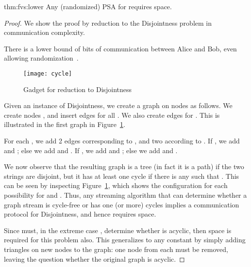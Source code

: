 \documentclass[11pt,letter]{article}
\newcommand{\COMMENTED}[1]{{}}
\newcommand{\junk}[1]{\COMMENTED{#1}}
\begin{document}
\begin{reptheorem}{thm:fvs:lower}
Any (randomized) PSA for  requires  space.
\end{reptheorem}


\begin{proof}
We show the proof by reduction to the {\textsc Disjointness} problem
in communication complexity.

\begin{center}
\noindent{}
\end{center}

There is a lower bound of  bits of communication between
Alice and Bob, even allowing randomization~\cite{nisan}.

\begin{figure}[t]
\centering
\texttt{[image: cycle]}
\caption{Gadget for reduction to {\textsc Disjointness}}
\label{fig:disj}
\end{figure}

Given an instance of {\textsc Disjointness}, we create a graph on 
nodes as follows.
We create nodes , and insert edges
 for all .
We also create edges  for .
This is illustrated in the first graph in Figure~\ref{fig:disj}.

For each , we add 2 edges corresponding to , and two according
to .
If , we add  and ; else we add  and .
If , we add  and ; else we add  and .

We now observe that the resulting graph is a tree (in fact it is a
path) if the two strings are disjoint, but it has at least one cycle
if there is any  such that .
This can be seen by inspecting Figure~\ref{fig:disj}, which shows the
configuration for each possibility for  and .
Thus, any streaming algorithm that can determine whether a graph
stream is cycle-free or has one (or more) cycles implies a
communication protocol for {\sc Disjointness}, and hence requires
 space.

Since  must, in the extreme case , determine whether 
is acyclic, then  space is required for this problem also.
This generalizes to any constant 
by simply adding  triangles
on  new nodes to the graph: one node from each must be removed,
leaving the question whether the original graph is acyclic.
\junk{
First we give a lower bound for a relative of the {\textsc Index}
problem that we refer to as the \textsc{Index Same} problem.
\begin{center}
\noindent\framebox{\begin{minipage}{0.95\columnwidth}
\textsc{Index Same}\\
\emph{Input}: Alice has a string  given by .\\ Bob has an index \\
\emph{Question}: Bob wants to check if .
\end{minipage}}
\end{center}

}
\end{proof}
\end{document}
